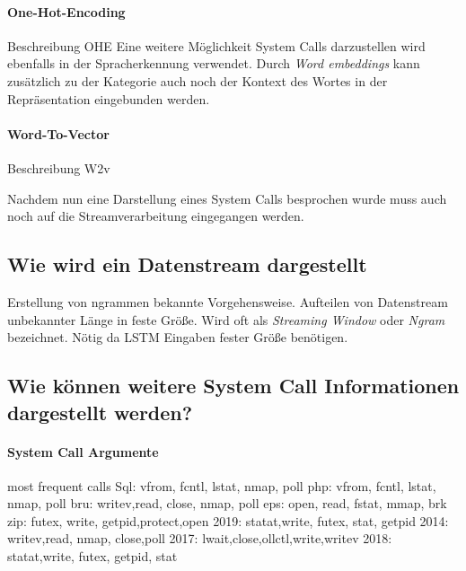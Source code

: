             \paragraph{One-Hot-Encoding}
                Beschreibung OHE
            Eine weitere Möglichkeit System Calls darzustellen wird ebenfalls in der Spracherkennung verwendet.
            Durch \textit{Word embeddings} kann zusätzlich zu der Kategorie auch noch der Kontext des Wortes in der Repräsentation eingebunden werden.
            \paragraph{Word-To-Vector}
                Beschreibung W2v

            Nachdem nun eine Darstellung eines System Calls besprochen wurde muss auch noch auf die Streamverarbeitung eingegangen werden.

        \subsection{Wie wird ein Datenstream dargestellt}\label{sec:streamdarstellung}
            Erstellung von ngrammen bekannte Vorgehensweise.
            Aufteilen von Datenstream unbekannter Länge in feste Größe.
            Wird oft als \textit{Streaming Window} oder \textit{Ngram} bezeichnet.
            Nötig da LSTM Eingaben fester Größe benötigen.

        \subsection{Wie können weitere System Call Informationen dargestellt werden?}\label{sec:Meta}
            \paragraph{System Call Argumente}  
                most frequent calls
                Sql: vfrom, fcntl, lstat, nmap, poll
                php: vfrom, fcntl, lstat, nmap, poll
                bru: writev,read,  close, nmap, poll
                eps: open,  read,  fstat, mmap, brk
                zip: futex, write, getpid,protect,open
                2019: statat,write, futex, stat, getpid
                2014: writev,read,  nmap,  close,poll
                2017: lwait,close,ollctl,write,writev
                2018: statat,write, futex, getpid, stat


